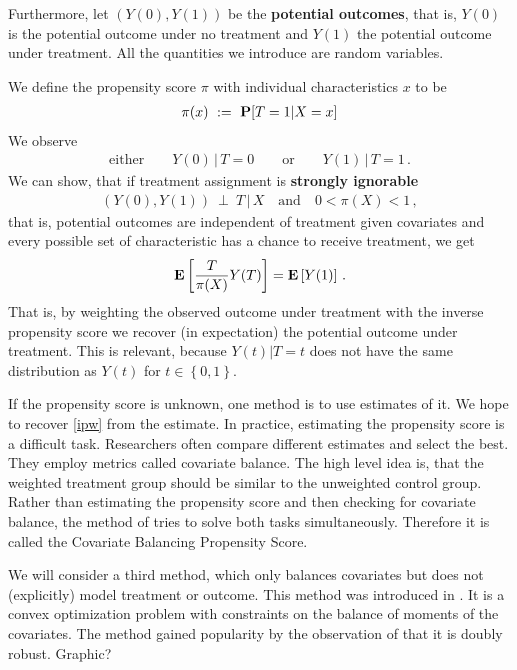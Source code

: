 Furthermore, let $(Y(0),Y(1))$ be the \textbf{potential outcomes}, that is, $Y(0)$ is the potential outcome under no treatment and $Y(1)$ the potential outcome under treatment.
All the quantities we introduce are random variables.

We define the propensity score $\pi$ with individual characteristics $x$ to be
\begin{gather}
\pi(x)
\ 
:=
\ 
\P[T=1|X=x]
\end{gather}
We observe  
\begin{gather}
  \text{either}
  \qquad
  Y(0)\,|\,T=0
  \qquad
  \text{or}\qquad
  Y(1)\,|\,T=1
  \,.
\end{gather}
We can show, that if treatment assignment is \textbf{strongly ignorable}\cite[(1.3)]{Rosenbaum1983}
\begin{gather}
  (Y(0),Y(1))\ \perp \ T \,|\,X
  \quad
  \text{and}
  \quad
  0<\pi(X)<1
  \,,
\end{gather}
that is, 
potential outcomes are independent of treatment given covariates and every possible set of characteristic has a chance to receive treatment,
we get 
\begin{gather}
  \label{ipw}
  \mathbf{E}
  \left[ 
    \frac{T}{\pi(X)}Y(T)
  \right]
  =
  \mathbf{E}
  \left[ Y(1) \right]
  \,.
\end{gather}
That is, by weighting the observed outcome under treatment with the inverse propensity score we recover (in expectation) the potential outcome under treatment. 
This is relevant, because 
$Y(t)|T=t$ does not have the same distribution as $Y(t)$ for $t\in \left\{ 0,1 \right\}$.

If the propensity score is unknown, one method is to use estimates of it.
We hope to recover \eqref{ipw} from the estimate.
In practice, estimating the propensity score is a difficult task.
Researchers often compare different estimates and select the best. 
They employ metrics called covariate balance.
The high level idea is, that the weighted treatment group should be similar to the unweighted control group. 
Rather than estimating the propensity score and then checking for covariate balance,
the method of \cite{Imai2014a} tries to solve both tasks simultaneously.
Therefore it is called the Covariate Balancing Propensity Score.

We will consider a third method, which only balances covariates but does not (explicitly) model treatment or outcome.
This method was introduced in \cite{Hainmueller2012}. 
It is a convex optimization problem with constraints on the balance of moments of the covariates.
The method gained popularity by the observation of \cite{Zhao2017a}
that it is doubly robust.
Graphic?

